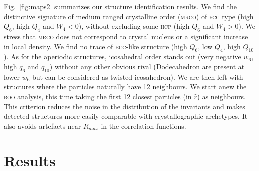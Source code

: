 \documentclass[11pt,a4paper]{article}
\begin{document}
Fig.~\ref{fig:maps2} summarizes our structure identification results. We find the distinctive signature of medium ranged crystalline order (\textsc{mrco}) of \textsc{fcc} type (high $Q_6$, high $Q_4$ and $W_4<0$), without excluding some \textsc{hcp} (high $Q_6$ and $W_4>0$). We stress that \textsc{mrco} does not correspond to crystal nucleus or a significant increase in local density. We find no trace of \textsc{bcc}-like structure (high $Q_6$, low $Q_4$, high $Q_{10}$). As for the aperiodic structures, icosahedral order stands out (very negative $w_6$, high $q_6$ and $q_{10}$) without any other obvious rival (Dodecahedron are present at lower $w_6$ but can be considered as twisted icosahedron). We are then left with structures where the particles naturally have 12 neighbours. We start anew the \textsc{boo} analysis, this time taking the first 12 closest particles (in $\hat{r}$) as neighbours. This criterion reduces the noise in the distribution of the invariants and makes detected structures more easily comparable with crystallographic archetypes. It also avoids artefacts near $R_{max}$ in the correlation functions.

\section*{Results}
\end{document}

